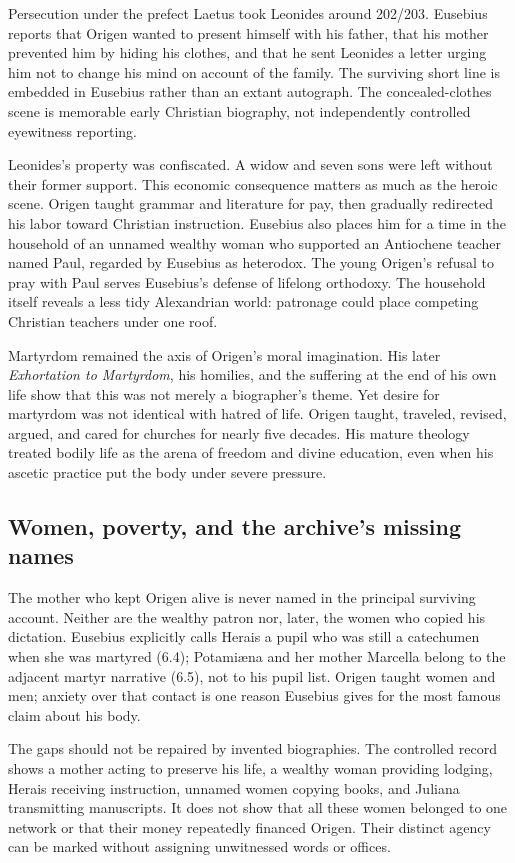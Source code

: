 Persecution under the prefect Laetus took Leonides around 202/203. Eusebius
reports that Origen wanted to present himself with his father, that his mother
prevented him by hiding his clothes, and that he sent Leonides a letter urging
him not to change his mind on account of the family. The surviving short line
is embedded in Eusebius rather than an extant autograph. The concealed-clothes
scene is memorable early Christian biography, not independently controlled
eyewitness reporting.

Leonides's property was confiscated. A widow and seven sons were left without
their former support. This economic consequence matters as much as the heroic
scene. Origen taught grammar and literature for pay, then gradually redirected
his labor toward Christian instruction. Eusebius also places him for a time in
the household of an unnamed wealthy woman who supported an Antiochene teacher
named Paul, regarded by Eusebius as heterodox. The young Origen's refusal to
pray with Paul serves Eusebius's defense of lifelong orthodoxy. The household
itself reveals a less tidy Alexandrian world: patronage could place competing
Christian teachers under one roof.

Martyrdom remained the axis of Origen's moral imagination. His later
\emph{Exhortation to Martyrdom}, his homilies, and the suffering at the end of
his own life show that this was not merely a biographer's theme. Yet desire for
martyrdom was not identical with hatred of life. Origen taught, traveled,
revised, argued, and cared for churches for nearly five decades. His mature
theology treated bodily life as the arena of freedom and divine education,
even when his ascetic practice put the body under severe pressure.

\subsection{Women, poverty, and the archive's missing names}

The mother who kept Origen alive is never named in the principal surviving
account. Neither are the wealthy patron nor, later, the women who copied his
dictation. Eusebius explicitly calls Herais a pupil who was still a
catechumen when she was martyred (6.4); Potami\ae na and her mother Marcella
belong to the adjacent martyr narrative (6.5), not to his pupil list. Origen
taught women and men; anxiety over that contact is one reason Eusebius gives
for the most famous claim about his body.

The gaps should not be repaired by invented biographies. The controlled record
shows a mother acting to preserve his life, a wealthy woman providing lodging,
Herais receiving instruction, unnamed women copying books, and Juliana
transmitting manuscripts. It does not show that all these women belonged to
one network or that their money repeatedly financed Origen. Their distinct
agency can be marked without assigning unwitnessed words or offices.

